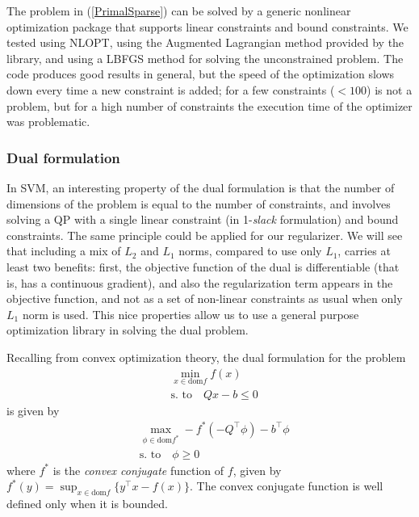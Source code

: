 \documentclass[10pt,letterpaper]{article}
\newcommand{\+}[1]{\ensuremath{{\boldsymbol #1}}}
\begin{document}
The problem in (\ref{PrimalSparse}) can be solved by a generic nonlinear optimization package that supports linear constraints and bound constraints. We tested using NLOPT,  using the Augmented Lagrangian method provided by the library, and using a LBFGS method for solving the unconstrained problem. The code produces good results in general, but the speed of the optimization slows down every time a new constraint is added; for a few constraints ($<100$) is not a problem, but for a high number of constraints the execution time of the optimizer was problematic.

\subsubsection{Dual formulation}
In SVM, an interesting property of the dual formulation is that the number of dimensions of the problem is equal to the number of constraints, and involves solving a QP with a single linear constraint (in 1-\emph{slack} formulation) and bound constraints. The same principle could be applied for our regularizer. We will see that including a mix of $L_2$ and $L_1$ norms, compared to use only $L_1$, carries at least two benefits: first, the objective function of the dual is differentiable (that is, has a continuous gradient), and also the regularization term appears in the objective function, and not as a set of non-linear constraints as usual when only $L_1$ norm is used. This nice properties allow us to use a general purpose optimization library in solving the dual problem.

Recalling from convex optimization theory, the dual formulation for the problem
\begin{equation}
\begin{split}
&\min_{x \in \text{dom$f$}} f(x) \\
& \text{s. to} \quad Qx-b \le 0
\end{split}
\end{equation}
is given by
\begin{equation}
\begin{split}
&\max_{\phi \in \text{dom$f^*$}} -f^*(-Q^\top \phi) - b^\top\phi \\
& \text{s. to} \quad \phi \ge 0
\end{split}
\end{equation}
where $f^*$ is the \emph{convex conjugate} function of $f$, given by $f^*(y) = \sup_{x \in \text{dom$f$}}\{y^\top x-f(x)\}$. The convex conjugate function is well defined only when it is bounded.
\end{document}
